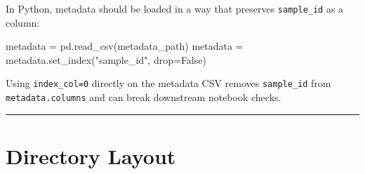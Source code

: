 \documentclass[
  letterpaper,
  DIV=11,
  numbers=noendperiod,
  openany,
  oneside]{scrreprt}
\newenvironment{Shaded}{\begin{snugshade}}{\end{snugshade}}
\newcommand{\AttributeTok}[1]{\textcolor[rgb]{0.40,0.45,0.13}{#1}}
\newcommand{\DecValTok}[1]{\textcolor[rgb]{0.68,0.00,0.00}{#1}}
\newcommand{\FunctionTok}[1]{\textcolor[rgb]{0.28,0.35,0.67}{#1}}
\newcommand{\NormalTok}[1]{\textcolor[rgb]{0.00,0.23,0.31}{#1}}
\newcommand{\OperatorTok}[1]{\textcolor[rgb]{0.37,0.37,0.37}{#1}}
\newcommand{\OtherTok}[1]{\textcolor[rgb]{0.00,0.23,0.31}{#1}}
\newcommand{\SpecialCharTok}[1]{\textcolor[rgb]{0.37,0.37,0.37}{#1}}
\newcommand{\StringTok}[1]{\textcolor[rgb]{0.13,0.47,0.30}{#1}}
\newcommand{\VariableTok}[1]{\textcolor[rgb]{0.07,0.07,0.07}{#1}}
\begin{document}
\begin{Shaded}
\end{Shaded}

In Python, metadata should be loaded in a way that preserves
\texttt{sample\_id} as a column:

\begin{Shaded}
\begin{Highlighting}[]
\NormalTok{metadata }\OperatorTok{=}\NormalTok{ pd.read\_csv(metadata\_path)}
\NormalTok{metadata }\OperatorTok{=}\NormalTok{ metadata.set\_index(}\StringTok{"sample\_id"}\NormalTok{, drop}\OperatorTok{=}\VariableTok{False}\NormalTok{)}
\end{Highlighting}
\end{Shaded}

Using \texttt{index\_col=0} directly on the metadata CSV removes
\texttt{sample\_id} from \texttt{metadata.columns} and can break
downstream notebook checks.

\begin{center}\rule{0.5\linewidth}{0.5pt}\end{center}

\section*{Directory Layout}\label{directory-layout}

\end{document}
